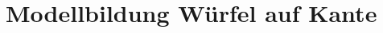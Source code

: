 \documentclass[11pt]{book}
\begin{document}


\chapter{Modellbildung Würfel auf Kante}


\end{document}
